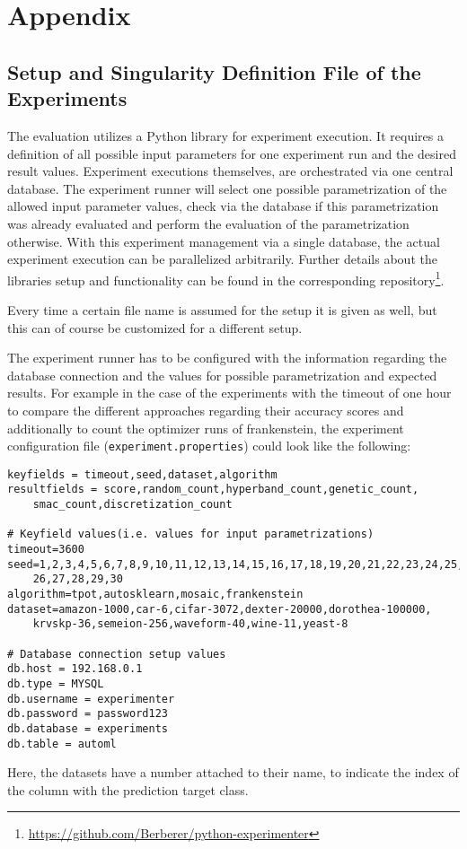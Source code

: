 %
\chapter{Appendix}
\label{sec:appendix}

\section{Setup and Singularity Definition File of the Experiments}
\label{sec:appendix:singularity}
The evaluation utilizes a Python library for experiment execution.
It requires a definition of all possible input parameters for one experiment run and the desired result values.\newline
Experiment executions themselves, are orchestrated via one central database.
The experiment runner will select one possible parametrization of the allowed input parameter values, check via the database if this parametrization was already evaluated and perform the evaluation of the parametrization otherwise.
With this experiment management via a single database, the actual experiment execution can be parallelized arbitrarily.
Further details about the libraries setup and functionality can be found in the corresponding repository\footnote{\url{https://github.com/Berberer/python-experimenter}}.\newline

Every time a certain file name is assumed for the setup it is given as well, but this can of course be customized for a different setup.

The experiment runner has to be configured with the information regarding the database connection and the values for possible parametrization and expected results.
For example in the case of the experiments with the timeout of one hour to compare the different approaches regarding their accuracy scores and additionally to count the optimizer runs of frankenstein, the experiment configuration file (\texttt{experiment.properties}) could look like the following:
\begin{Verbatim}[fontsize=\scriptsize]
keyfields = timeout,seed,dataset,algorithm
resultfields = score,random_count,hyperband_count,genetic_count,
    smac_count,discretization_count

# Keyfield values(i.e. values for input parametrizations)
timeout=3600
seed=1,2,3,4,5,6,7,8,9,10,11,12,13,14,15,16,17,18,19,20,21,22,23,24,25,
    26,27,28,29,30
algorithm=tpot,autosklearn,mosaic,frankenstein
dataset=amazon-1000,car-6,cifar-3072,dexter-20000,dorothea-100000,
    krvskp-36,semeion-256,waveform-40,wine-11,yeast-8

# Database connection setup values
db.host = 192.168.0.1
db.type = MYSQL
db.username = experimenter
db.password = password123
db.database = experiments
db.table = automl
\end{Verbatim}
Here, the datasets have a number attached to their name, to indicate the index of the column with the prediction target class.

